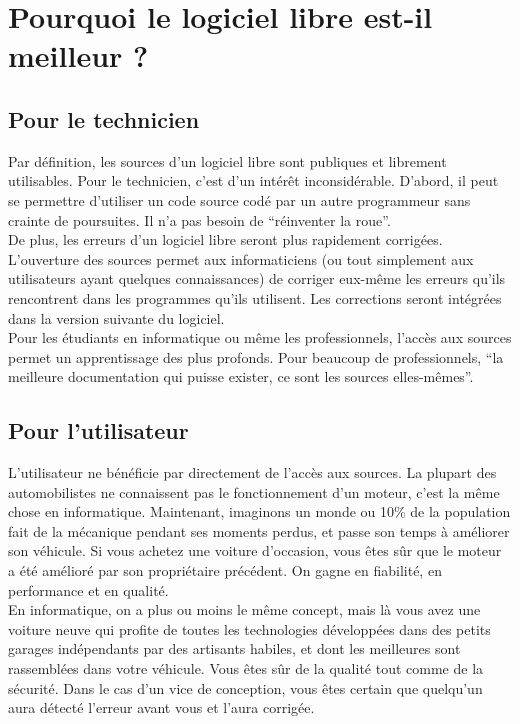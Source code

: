 \documentclass{article}
\begin{document}
\newpage

\section{Pourquoi le logiciel libre est-il meilleur ?}

\subsection{Pour le technicien}
Par définition, les sources d'un logiciel libre sont publiques et librement utilisables. Pour le technicien, c'est d'un intérêt inconsidérable. D'abord, il peut se permettre d'utiliser un code source codé par un autre programmeur sans crainte de poursuites. Il n'a pas besoin de ``réinventer la roue''. \vspace{5mm} \\
De plus, les erreurs d'un logiciel libre seront plus rapidement corrigées. L'ouverture des sources permet aux informaticiens (ou tout simplement aux utilisateurs ayant quelques connaissances) de corriger eux-même les erreurs qu'ils rencontrent dans les programmes qu'ils utilisent. Les corrections seront intégrées dans la version suivante du logiciel. \vspace{5mm} \\
Pour les étudiants en informatique ou même les professionnels, l'accès aux sources permet un apprentissage des plus profonds. Pour beaucoup de professionnels, ``la meilleure documentation qui puisse exister, ce sont les sources elles-mêmes''.

\subsection{Pour l'utilisateur}
L'utilisateur ne bénéficie par directement de l'accès aux sources. La plupart des automobilistes ne connaissent pas le fonctionnement d'un moteur, c'est la même chose en informatique. Maintenant, imaginons un monde ou 10\% de la population fait de la mécanique pendant ses moments perdus, et passe son temps à améliorer son véhicule. Si vous achetez une voiture d'occasion, vous êtes sûr que le moteur a été amélioré par son propriétaire précédent. On gagne en fiabilité, en performance et en qualité. \vspace{5mm} \\
En informatique, on a plus ou moins le même concept, mais là vous avez une voiture neuve qui profite de toutes les technologies développées dans des petits garages indépendants par des artisants habiles, et dont les meilleures sont rassemblées dans votre véhicule. Vous êtes sûr de la qualité tout comme de la sécurité. Dans le cas d'un vice de conception, vous êtes certain que quelqu'un aura détecté l'erreur avant vous et l'aura corrigée.
\end{document}
